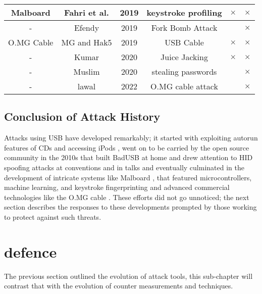 {\begin{tabular}{|c c c c c c|}
 \hline
 Malboard & Fahri et al. \cite{farhiMalboardNovelUser2019} & 2019 & keystroke profiling & $\times$ & $\times$\\
 \hline
  - & Efendy\cite{efendyExploringPossibilityUSB2019} & 2019 & Fork Bomb Attack & & $\times$ \\
 \hline
 O.MG Cable & MG and Hak5  \cite{hak5MGCable} \cite{MGCable2019a} & 2019 & USB Cable & $\times$ & $\times$ \\
 \hline
- & Kumar \cite{kumarJuiceJackingUSB2020} & 2020 & Juice Jacking & $\times$ & $\times$ \\
\hline
- & Muslim \cite{muslimImplementationAnalysisUSB2020} & 2020 & stealing passwords & & $\times$ \\
\hline
-  & lawal \cite{lawalFacilitatingCyberenabledFraud2022} & 2022 & O.MG cable attack & & $\times$ \\
 \hline 
\end{tabular}
\label{attack_table}
}

\subsection{Conclusion of Attack History}

Attacks using USB have developed remarkably; it started with exploiting autorun features of CDs \cite{al-zarouniRealityRisksConsented2006}  and accessing iPods  \cite{SharpIdeasDownloads2006}, went on to be carried by the open source community \cite{NSAPlaysetTurnipschoolHtml} in the 2010s that built BadUSB at home \cite{SamyKamkarUSBdriveby} and drew attention to HID spoofing attacks at conventions and in talks \cite{Srlabsbadusbblackhatv1Pdf2014} and eventually culminated in the development of intricate systems like Malboard \cite{farhiMalboardNovelUser2019}, that featured microcontrollers, machine learning, and keystroke fingerprinting and advanced commercial technologies like the O.MG cable \cite{hak5MGCable}. These efforts did not go unnoticed; the next section describes the responses to these developments prompted by those working to protect against such threats.



\section{defence} \label{HistoryOfdefence}

The previous section outlined the evolution of attack tools, this sub-chapter will contrast that with the evolution of counter measurements and techniques. 


